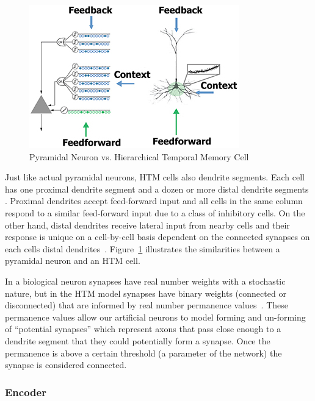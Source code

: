 \documentclass[oneside,12pt,openany]{book}
\begin{document}
	\begin{figure}[hbt!]
		\centering
		\includegraphics[width=.7\linewidth]{images/HTMCell.jpg}
		\caption[Pyramidal Neuron vs. Hierarchical Temporal Memory Cell]{Pyramidal Neuron vs. Hierarchical Temporal Memory Cell~\cite{TheHTMSpatialPooler}}
		\label{fig:HTMCell}
	\end{figure}

	Just like actual pyramidal neurons, HTM cells also dendrite segments. Each cell has one proximal dendrite segment and a dozen or more distal dendrite segments \cite {Whitepaper}. Proximal dendrites accept feed-forward input and all cells in the same column respond to a similar feed-forward input due to a class of inhibitory cells. On the other hand, distal dendrites receive lateral input from nearby cells and their response is unique on a cell-by-cell basis dependent on the connected synapses on each cells distal dendrites~\cite{Whitepaper}. Figure~\ref{fig:HTMCell} illustrates the similarities between a pyramidal neuron and an HTM cell.
	
	In a biological neuron synapses have real number weights with a stochastic nature, but in the HTM model synapses have binary weights (connected or disconnected) that are informed by real number permanence values~\cite{Whitepaper}. These permanence values allow our artificial neurons to model forming and un-forming of ``potential synapses'' which represent axons that pass close enough to a dendrite segment that they could potentially form a synapse. Once the permanence is above a certain threshold (a parameter of the network) the synapse is considered connected.
	
	\subsubsection{Encoder}
	
\end{document}
